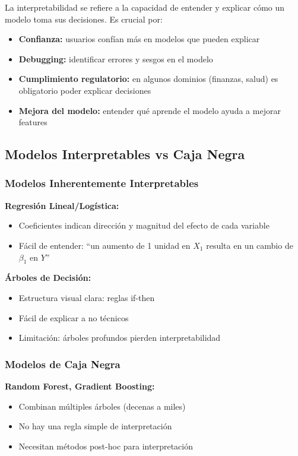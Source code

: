 \documentclass[11pt,a4paper]{article}
\begin{document}
La interpretabilidad se refiere a la capacidad de entender y explicar cómo un modelo toma sus decisiones. Es crucial por:

\begin{itemize}
\item \textbf{Confianza:} usuarios confían más en modelos que pueden explicar
\item \textbf{Debugging:} identificar errores y sesgos en el modelo
\item \textbf{Cumplimiento regulatorio:} en algunos dominios (finanzas, salud) es obligatorio poder explicar decisiones
\item \textbf{Mejora del modelo:} entender qué aprende el modelo ayuda a mejorar features
\end{itemize}

\subsection{Modelos Interpretables vs Caja Negra}

\subsubsection{Modelos Inherentemente Interpretables}

\textbf{Regresión Lineal/Logística:}
\begin{itemize}
\item Coeficientes indican dirección y magnitud del efecto de cada variable
\item Fácil de entender: ``un aumento de 1 unidad en $X_1$ resulta en un cambio de $\beta_1$ en $Y$''
\end{itemize}

\textbf{Árboles de Decisión:}
\begin{itemize}
\item Estructura visual clara: reglas if-then
\item Fácil de explicar a no técnicos
\item Limitación: árboles profundos pierden interpretabilidad
\end{itemize}

\subsubsection{Modelos de Caja Negra}

\textbf{Random Forest, Gradient Boosting:}
\begin{itemize}
\item Combinan múltiples árboles (decenas a miles)
\item No hay una regla simple de interpretación
\item Necesitan métodos post-hoc para interpretación
\end{itemize}
\end{document}
